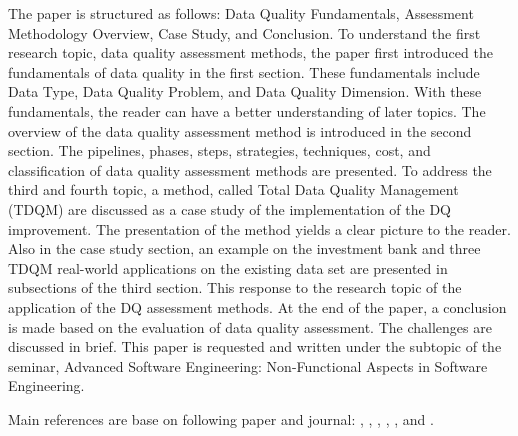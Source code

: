 \documentclass[pdftex,english,oribibl]{llncs}
\begin{document}
\begin{comment}
Researchers from academic and industry sectors are eager to explore more opportunities by employing these techniques. However, another issue quickly arises: How to one acquire high-quality data? Or, more precisely, how to defines the quality of a set of data? There is a famous saying in the field Machine Learning: "Garbage input equals garbage output!". That is, only with a systematic method to assess data set, are ML applications feasible for different domains. Traditionally, data labeling and assessment are done in either primitive or laborious manner, which becomes almost impossible in the big data era. The goal of this paper is to give an overview of methods to assess data quality and review the most popular data properties that can be analyzed. Moreover, this paper reviews several proposed data quality improvement methods after data quality are assessed. The application of the assessment methods is also presented.
\end{comment}

The paper is structured as follows: Data Quality Fundamentals, Assessment Methodology Overview,  Case Study, and Conclusion.
To understand the first research topic, data quality assessment methods, the paper first introduced the fundamentals of data quality in the first section. These fundamentals include Data Type, Data Quality Problem, and Data Quality Dimension. With these fundamentals, the reader can have a better understanding of later topics. The overview of the data quality assessment method is introduced in the second section. The pipelines, phases, steps, strategies, techniques, cost, and classification of data quality assessment methods are presented. To address the third and fourth topic,
a method, called Total Data Quality Management (TDQM) are discussed as a case study of the implementation of the DQ improvement. The presentation of the method yields a clear picture to the reader. Also in the case study section,  an example on the investment bank and three TDQM real-world applications on the existing data set are presented in subsections of the third section. This response to the research topic of the application of the DQ assessment methods.
At the end of the paper, a conclusion is made based on the evaluation of data quality assessment.  The challenges are discussed in brief. This paper is requested and written under the subtopic of the seminar, Advanced Software Engineering: Non-Functional Aspects in Software Engineering.

Main references are base on following paper and journal: \citet{Cai2005ChallnegesOfDataQuality}, \citet{Pipino2002DataQualityAssessment}, \citet{Batini2009MethodologiesForDataQuality}, \citet{Wang1996BeyondAccuracy},  \citet{Borek2011AClassficationOfDataQualityAssessmentMethod}, and
   \citet{Cappiello2004DataQualityAssessmentfromTheUse}.
\end{document}
